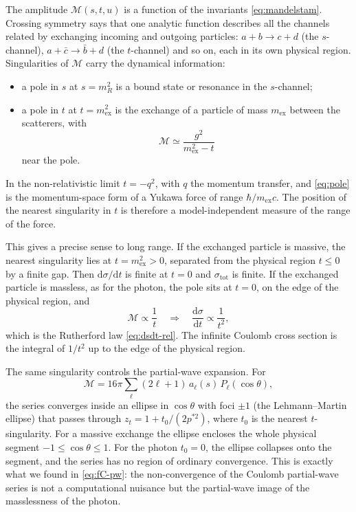 \documentclass[11pt,a4paper]{book}
\numberwithin{equation}{chapter}
\newcommand{\dd}{\mathrm{d}}
\begin{document}
The amplitude $\mathcal M(s,t,u)$ is a function of the invariants
\eqref{eq:mandelstam}. Crossing symmetry says that one analytic function
describes all the channels related by exchanging incoming and outgoing particles:
$a+b\to c+d$ (the $s$-channel), $a+\bar c\to\bar b+d$ (the $t$-channel) and so on,
each in its own physical region. Singularities of $\mathcal M$ carry the
dynamical information:
\begin{itemize}
  \item a pole in $s$ at $s=m_R^2$ is a bound state or resonance in the
        $s$-channel;
  \item a pole in $t$ at $t=m_{\mathrm{ex}}^2$ is the exchange of a particle of
        mass $m_{\mathrm{ex}}$ between the scatterers, with
        \begin{equation}\label{eq:pole}
          \mathcal M\simeq\frac{g^2}{m_{\mathrm{ex}}^2-t}
        \end{equation}
        near the pole.
\end{itemize}
In the non-relativistic limit $t=-q^2$, with $q$ the momentum transfer, and
\eqref{eq:pole} is the momentum-space form of a Yukawa force of range
$\hbar/m_{\mathrm{ex}}c$. The position of the nearest singularity in $t$ is
therefore a model-independent measure of the range of the force.

This gives a precise sense to long range. If the exchanged particle is massive,
the nearest singularity lies at $t=m_{\mathrm{ex}}^2>0$, separated from the
physical region $t\le0$ by a finite gap. Then $\dd\sigma/\dd t$ is finite at
$t=0$ and $\sigma_{\mathrm{tot}}$ is finite. If the exchanged particle is
massless, as for the photon, the pole sits at $t=0$, on the edge of the physical
region, and
\begin{equation}\label{eq:pole-xs}
  \mathcal M\propto\frac1t\quad\Longrightarrow\quad\frac{\dd\sigma}{\dd t}\propto\frac1{t^2},
\end{equation}
which is the Rutherford law \eqref{eq:dsdt-rel}. The infinite Coulomb cross
section is the integral of $1/t^2$ up to the edge of the physical region.

The same singularity controls the partial-wave expansion. For
\[
  \mathcal M=16\pi\sum_\ell(2\ell+1)\,a_\ell(s)\,P_\ell(\cos\theta),
\]
the series converges inside an ellipse in $\cos\theta$ with foci $\pm1$ (the
Lehmann--Martin ellipse) that passes through $z_t=1+t_0/(2p^{*2})$, where $t_0$
is the nearest $t$-singularity. For a massive exchange the ellipse encloses the whole physical
segment $-1\le\cos\theta\le1$. For the photon $t_0=0$, the ellipse collapses onto
the segment, and the series has no region of ordinary convergence. This is exactly
what we found in \eqref{eq:fC-pw}: the non-convergence of the Coulomb partial-wave
series is not a computational nuisance but the partial-wave image of the
masslessness of the photon.
\end{document}
